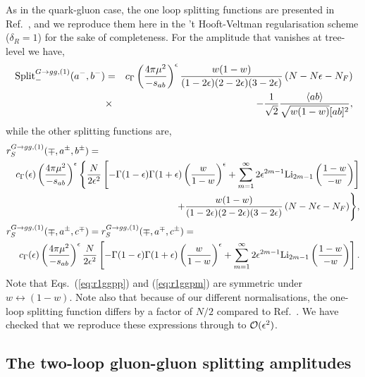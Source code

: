 \documentclass[paper,notoc,nohyper]{JHEP3}
\def\e{\epsilon}
\def\Split{\, {\rm Split}}
\def\NF{N_F}
\def\OMWW{\frac{1-w}{-w}}
\def\Li{{\rm Li}}
\def\e{\epsilon}
\begin{document}
As in the quark-gluon case, the one loop splitting functions are presented in 
Ref.~\cite{Bern:split1QCD}, and we
reproduce them here in the 't Hooft-Veltman regularisation scheme
($\delta_R = 1$) for the sake of completeness.
For the amplitude that vanishes at tree-level we have,
\begin{eqnarray}
\Split_{-}^{G \to gg,(1)}(a^{-},b^{-})&=&c_\Gamma
\left(\frac{4\pi\mu^2}{-s_{ab}}\right)^{\epsilon}
\frac{w(1-w)}{(1-2\e)(2-2\e)(3-2\e)}\left( N-N\e-\NF\right)\nonumber
\\
&\times& -\frac{1}{\sqrt{2}}\frac{\langle ab\rangle}{\sqrt{w(1-w)}[ab]^2},
\end{eqnarray}
while the other splitting functions are,
\begin{eqnarray}
\label{eq:r1ggpp}
\lefteqn{r_{S}^{G \to gg,(1)}(\mp,a^{\pm},b^{\pm})=}\nonumber \\
&&
c_{\Gamma}(\e)\left(\frac{4\pi\mu^2}{-s_{ab}}\right)^{\epsilon}
\Biggl\{
\frac{N}{2\epsilon^2}\left[
-\Gamma(1-\epsilon)\Gamma(1+\epsilon)\left(\frac{w}{1-w}\right)^{\epsilon}
+\sum_{m=1}^{\infty} 2\epsilon^{2m-1} \Li_{2m-1}\left(\OMWW\right)
\right]\nonumber \\
&&\qquad\qquad\qquad+ \frac{w(1-w)}{(1-2\e)(2-2\e)(3-2\e)}\left(N-N\e-\NF\right)
\Biggr\},\\
\label{eq:r1ggpm}
\lefteqn{r_{S}^{G \to gg,(1)}(\mp,a^{\pm},c^{\mp})=r_{S}^{G \to gg,(1)}(\mp,a^{\mp},c^{\pm})=}\nonumber \\
&&
c_{\Gamma}(\e)\left(\frac{4\pi\mu^2}{-s_{ab}}\right)^{\epsilon}
\frac{N}{2\epsilon^2}\left[
-\Gamma(1-\epsilon)\Gamma(1+\epsilon)\left(\frac{w}{1-w}\right)^{\epsilon}
+\sum_{m=1}^{\infty} 2\epsilon^{2m-1} \Li_{2m-1}\left(\OMWW\right)
\right].\nonumber \\
\end{eqnarray}
Note that Eqs.~(\ref{eq:r1ggpp}) and (\ref{eq:r1ggpm}) are symmetric under $w \leftrightarrow (1-w)$.
Note also that because of our different normalisations, the one-loop splitting function differs by a factor of
$N/2$ compared to Ref.~\cite{Bern:split1QCD}. 
We have checked that we reproduce these expressions through 
to ${\cal O}(\e^2)$.
 
\subsection{The two-loop gluon-gluon splitting amplitudes}
\end{document}
